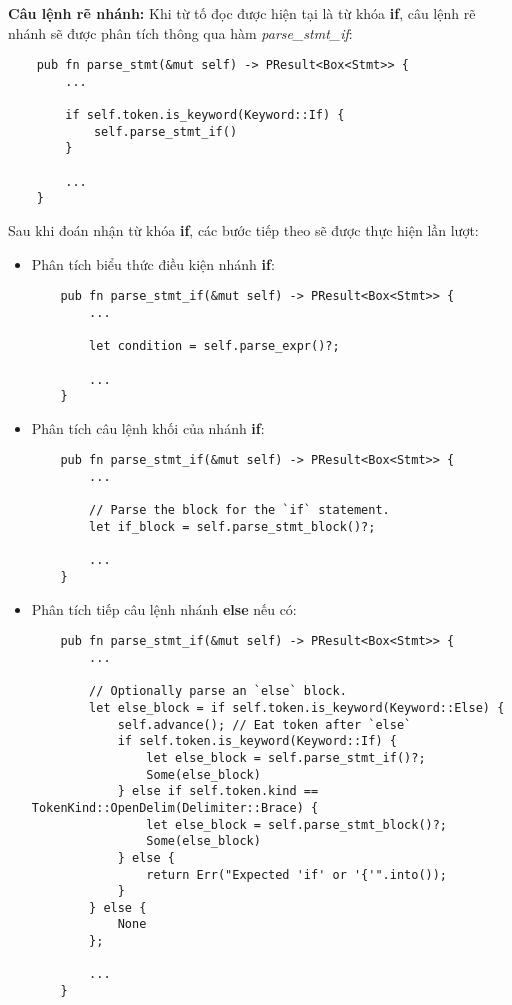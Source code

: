\textbf{Câu lệnh rẽ nhánh:} Khi từ tố đọc được hiện tại là từ khóa \textbf{if}, câu lệnh rẽ nhánh sẽ được phân tích thông qua hàm \textit{parse\_stmt\_if}:
\begin{lstlisting}
    pub fn parse_stmt(&mut self) -> PResult<Box<Stmt>> {
        ...
        
        if self.token.is_keyword(Keyword::If) {
            self.parse_stmt_if()
        } 
        
        ...
    }
\end{lstlisting}
Sau khi đoán nhận từ khóa \textbf{if}, các bước tiếp theo sẽ được thực hiện lần lượt:
\begin{itemize}
    \item Phân tích biểu thức điều kiện nhánh \textbf{if}:
\begin{lstlisting}
    pub fn parse_stmt_if(&mut self) -> PResult<Box<Stmt>> {
        ...

        let condition = self.parse_expr()?;

        ...
    }
\end{lstlisting}
    \item Phân tích câu lệnh khối của nhánh \textbf{if}:
\begin{lstlisting}
    pub fn parse_stmt_if(&mut self) -> PResult<Box<Stmt>> {
        ...

        // Parse the block for the `if` statement.
        let if_block = self.parse_stmt_block()?;

        ...
    }
\end{lstlisting}
    \item Phân tích tiếp câu lệnh nhánh \textbf{else} nếu có:
\begin{lstlisting}
    pub fn parse_stmt_if(&mut self) -> PResult<Box<Stmt>> {
        ...

        // Optionally parse an `else` block.
        let else_block = if self.token.is_keyword(Keyword::Else) {
            self.advance(); // Eat token after `else`
            if self.token.is_keyword(Keyword::If) {
                let else_block = self.parse_stmt_if()?;
                Some(else_block)
            } else if self.token.kind == TokenKind::OpenDelim(Delimiter::Brace) {
                let else_block = self.parse_stmt_block()?;
                Some(else_block)
            } else {
                return Err("Expected 'if' or '{'".into());
            }
        } else {
            None
        };

        ...
    }
\end{lstlisting}

\end{itemize}

